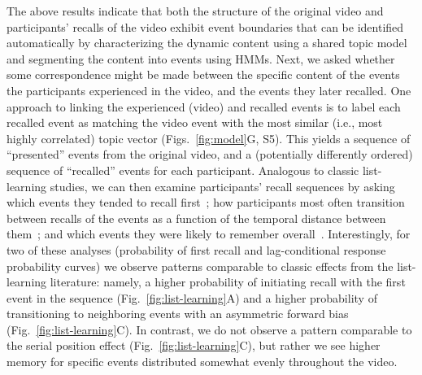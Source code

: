 \documentclass{article}
\newcommand{\matchmats}{S5}
\begin{document}
The above results indicate that both the structure of the original video and participants' recalls of the video exhibit event boundaries that can be identified automatically by characterizing the dynamic content using a shared topic model and segmenting the content into events using HMMs.  Next, we asked whether some correspondence might be made between the specific content of the events the participants experienced in the video, and the events they later recalled.  One approach to linking the experienced (video) and recalled events is to label each recalled event as matching the video event with the most similar (i.e., most highly correlated) topic vector (Figs.~\ref{fig:model}G, \matchmats).  This yields a sequence of ``presented'' events from the original video, and a (potentially differently ordered) sequence of ``recalled'' events for each participant.  Analogous to classic list-learning studies, we can then examine participants' recall sequences by asking which events they tended to recall first~\citep[probability of first recall; Fig.~\ref{fig:list-learning}A;][]{WelcBurn24, PostPhil65, AtkiShif68}; how participants most often transition between recalls of the events as a function of the temporal distance between them~\citep[lag-conditional response probability; Fig.~\ref{fig:list-learning}B;][]{Kaha96}; and which events they were likely to remember overall~\citep[serial position recall analyses; Fig.~\ref{fig:list-learning}C;][]{Murd62a}. Interestingly, for two of these analyses (probability of first recall and lag-conditional response probability curves) we observe patterns comparable to classic effects from the list-learning literature: namely, a higher probability of initiating recall with the first event in the sequence (Fig.~\ref{fig:list-learning}A) and a higher probability of transitioning to neighboring events with an asymmetric forward bias (Fig.~\ref{fig:list-learning}C). In contrast, we do not observe a pattern comparable to the serial position effect (Fig.~\ref{fig:list-learning}C), but rather we see higher memory for specific events distributed somewhat evenly throughout the video.
\end{document}
